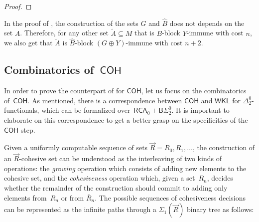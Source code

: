 \documentclass{article}
\def\L{\mathcal{L}}
\def\R{\mathcal{R}}
\def\M{\mathcal{M}}
\def\S{\mathcal{S}}
\newcommand{\IDelta}{\mathsf{I}\Delta^0}
\newcommand{\BSig}{\mathsf{B}\Sigma^0}
\newcommand{\RCA}[0]{\mathsf{RCA}}
\newcommand{\WKL}[0]{\mathsf{WKL}}
\newcommand{\COH}[0]{\mathsf{COH}}
\numberwithin{theorem}{section}
\begin{document}
\begin{proof}



\end{proof}

In the proof of , the construction of the sets $G$ and $\hat{B}$ does not depends on the set $A$. Therefore, for any other set $\tilde{A} \subseteq M$ that is $B$-block $Y$-immune with cost $n$, we also get that $\tilde{A}$ is $\hat{B}$-block $(G \oplus Y)$-immune with cost $n+2$.


\subsection{Combinatorics of~$\COH$}

In order to prove the counterpart of  for $\COH$, let us focus on the combinatorics of~$\COH$.
As mentioned, there is a correspondence between $\COH$ and $\WKL$ for $\Delta^0_2$-functionals, which can be formalized over~$\RCA_0+ \BSig_2$. It is important to elaborate on this correspondence to get a better grasp on the specificities of the $\COH$ step.

Given a uniformly computable sequence of sets $\vec{R} = R_0, R_1, \dots$, the construction of an $\vec{R}$-cohesive set can be understood as the interleaving of two kinds of operations: the \emph{growing} operation which consists of adding new elements to the cohesive set, and the \emph{cohesiveness} operation which, given a set~$R_n$, decides whether the remainder of the construction should commit to adding only elements from~$R_n$ or from $\overline{R}_n$.
The possible sequences of cohesiveness decisions can be represented as the infinite paths through a $\Sigma_1(\vec{R})$ binary tree as follows:
\end{document}
